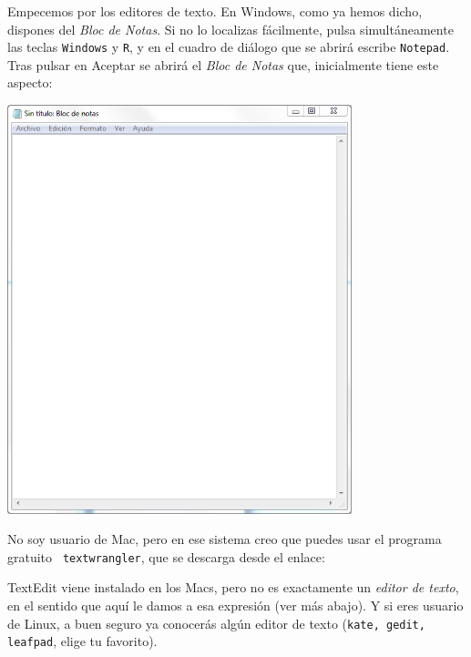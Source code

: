 \documentclass[10pt,a4paper]{article}
\begin{document}
Empecemos por los editores de texto. En Windows, como ya hemos dicho, dispones del {\em Bloc de
Notas}. Si no lo localizas fácilmente, pulsa simultáneamente las teclas {\tt Windows} y {\tt R}, y
en el cuadro de diálogo que se abrirá escribe {\tt Notepad}. Tras pulsar en Aceptar se abrirá el
{\em Bloc de Notas} que, inicialmente tiene este aspecto:
\begin{center}
\includegraphics[width=10cm]{../fig/Tut00-BlocDeNotas.png}
\end{center}
No soy usuario de Mac, pero en ese sistema creo que puedes usar el programa gratuito {\tt
textwrangler}, que se descarga desde el enlace:
      \begin{center}
      \end{center}
TextEdit viene instalado en los Macs, pero no es exactamente un {\em editor de texto}, en el
sentido que aquí le damos a esa expresión (ver más abajo). Y si eres usuario de Linux, a buen
seguro ya conocerás algún editor de texto ({\tt kate, gedit, leafpad}, elige tu favorito).
\end{document}
